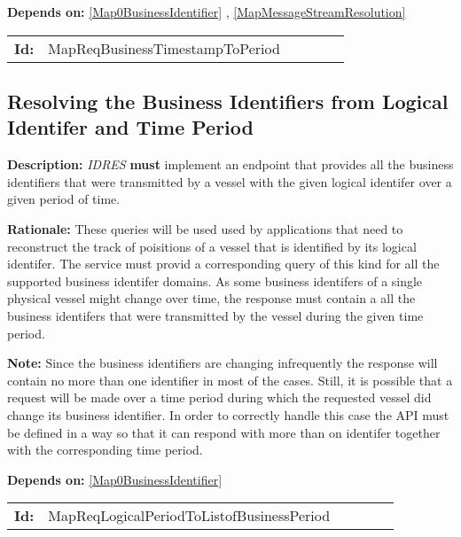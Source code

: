 \textbf{Depends on:} \ref{Map0BusinessIdentifier} , \ref{MapMessageStreamResolution} 

\par
{\small \begin{center}\begin{tabular}{rlrlrl}
\textbf{Id:} & MapReqBusinessTimestampToPeriod  & & & \end{tabular}\end{center} }

\subsection{Resolving the Business Identifiers from Logical Identifer and Time Period }\label{MapReqLogicalPeriodToListofBusinessPeriod}
\textbf{Description:} \textsl{IDRES} \textbf{must} implement an endpoint that provides  all the business identifiers that were transmitted by a vessel with the  given logical identifer over a given period of time. 

\textbf{Rationale:} These queries will be used used by applications that need to reconstruct the track of poisitions of a  vessel that is identified by its logical identifer. The  service must provid a corresponding query of this kind for all the  supported business identifer domains. As some business identifers  of a single physical vessel might  change over time, the response must contain a all the  business identifers that were transmitted by the vessel  during the given time period.

\textbf{Note:} Since the business identifiers are changing infrequently the  response will contain no more than one identifier in most of the cases. Still, it is possible that a request will be made over a time period during which the requested vessel did change its business identifier. In order to correctly handle this case the API must be defined in a way  so that it can respond with more than on identifer together with the  corresponding time period.

\textbf{Depends on:} \ref{Map0BusinessIdentifier} 

\par
{\small \begin{center}\begin{tabular}{rlrlrl}
\textbf{Id:} & MapReqLogicalPeriodToListofBusinessPeriod  & & & \end{tabular}\end{center} }

